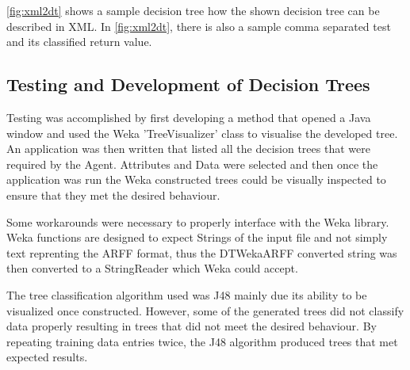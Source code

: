 \ref{fig:xml2dt} shows a sample decision tree how the shown decision tree can be described in XML.  In \ref{fig:xml2dt}, 
there is also a sample comma separated test and its classified return value.

\subsection{Testing and Development of Decision Trees}
Testing was accomplished by first developing a method that opened a Java window and used the Weka
'TreeVisualizer' class to visualise the developed tree.  An application was then written that listed
all the decision trees that were required by the Agent.  Attributes and Data were selected and then 
once the application was run the Weka constructed trees could be visually inspected to ensure that
they met the desired behaviour.

Some workarounds were necessary to properly interface with the Weka library.  Weka functions are
designed to expect Strings of the input file and not simply text reprenting the ARFF format, thus
the DTWekaARFF converted string was then converted to a StringReader which Weka could accept.

The tree classification algorithm used was J48 mainly due its ability to be visualized once constructed.
However, some of the generated trees did not classify data properly resulting in trees that did not
meet the desired behaviour.  By repeating training data entries twice, the J48 algorithm produced
trees that met expected results. 